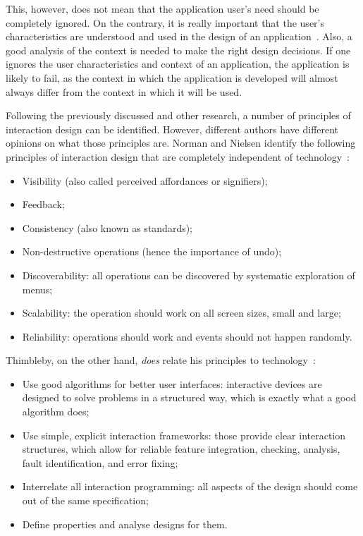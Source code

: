 This, however, does not mean that the application user's need should be completely ignored. On the contrary, it is really important that the user's characteristics are understood and used in the design of an application~\cite{badre2002shaping}. Also, a good analysis of the context is needed to make the right design decisions. If one ignores the user characteristics and context of an application, the application is  likely to fail, as the context in which the application is developed will almost always differ from the context in which it will be used.

Following the previously discussed and other research, a number of principles of interaction design can be identified. However, different authors have different opinions on what those principles are. Norman and Nielsen identify the following principles of interaction design that are completely independent of technology~\cite{norman2010gestural}:
\begin{itemize}[noitemsep,topsep=0pt,parsep=0pt,partopsep=0pt]
\item Visibility (also called perceived affordances or signifiers);
\item Feedback;
\item Consistency (also known as standards);
\item Non-destructive operations (hence the importance of undo);
\item Discoverability: all operations can be discovered by systematic exploration of menus;
\item Scalability: the operation should work on all screen sizes, small and large;
\item Reliability: operations should work and events should not happen randomly.
\end{itemize}
Thimbleby, on the other hand, \emph{does} relate his principles to technology~\cite{thimbleby2007press}:
\begin{itemize}[noitemsep,topsep=0pt,parsep=0pt,partopsep=0pt]
\item Use good algorithms for better user interfaces: interactive devices are designed to solve problems in a structured way, which is exactly what a good algorithm does;
\item Use simple, explicit interaction frameworks: those provide clear interaction structures, which allow for reliable feature integration, checking, analysis, fault identification, and error fixing;
\item Interrelate all interaction programming: all aspects of the design should come out of the same specification;
\item Define properties and analyse designs for them.
\end{itemize}
